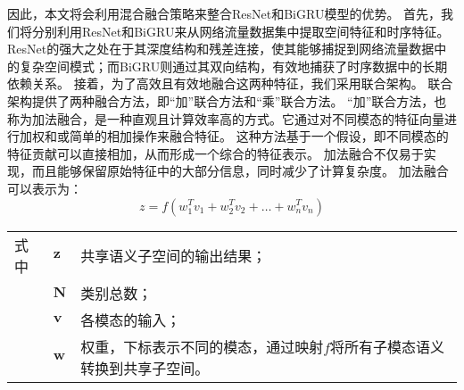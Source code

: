 因此，本文将会利用混合融合策略来整合ResNet和BiGRU模型的优势。
首先，我们将分别利用ResNet和BiGRU来从网络流量数据集中提取空间特征和时序特征。ResNet的强大之处在于其深度结构和残差连接，使其能够捕捉到网络流量数据中的复杂空间模式；而BiGRU则通过其双向结构，有效地捕获了时序数据中的长期依赖关系。
接着，为了高效且有效地融合这两种特征，我们采用联合架构。
联合架构提供了两种融合方法，即“加”联合方法和“乘”联合方法。
“加”联合方法，也称为加法融合，是一种直观且计算效率高的方式。它通过对不同模态的特征向量进行加权和或简单的相加操作来融合特征。
这种方法基于一个假设，即不同模态的特征贡献可以直接相加，从而形成一个综合的特征表示。
加法融合不仅易于实现，而且能够保留原始特征中的大部分信息，同时减少了计算复杂度。
加法融合可以表示为：
\begin{equation}
  z = f(w_1^Tv_1 + w_2^Tv_2+ \dots + w_n^Tv_n)
\end{equation}
\begin{flushleft}
  \renewcommand\arraystretch{1.25}
  \begin{tabularx}{\textwidth}{@{}>{\normalsize\rm}l@{\quad}>{\normalsize\rm}l@{——}>{\normalsize\rm}X@{}}
  式中& $\symbf{z}$ &共享语义子空间的输出结果；\\
  &  $\symbf{N}$&类别总数；\\
  &  $\symbf{v}$ &各模态的输入；\\
  &  $\symbf{w}$ & 权重，下标表示不同的模态，通过映射$f$将所有子模态语义转换到共享子空间。\\
  \end{tabularx}\vspace{.5ex}%
  \end{flushleft}


